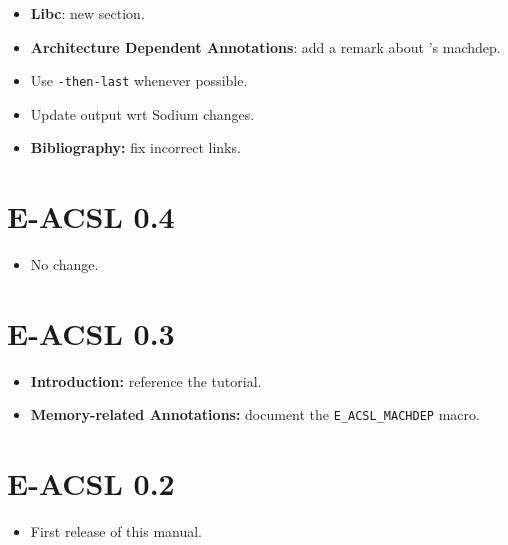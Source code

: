 \begin{itemize}
\item \textbf{Libc}: new section.
\item \textbf{Architecture Dependent Annotations}: add a remark about \gcc's
  machdep.
\item Use \texttt{-then-last} whenever possible.
\item Update output wrt \framac Sodium changes.
\item \textbf{Bibliography:} fix incorrect links.
\end{itemize}

\section*{E-ACSL 0.4}

\begin{itemize}
\item No change.
\end{itemize}

\section*{E-ACSL 0.3}
\begin{itemize}
\item \textbf{Introduction:} reference the \eacsl tutorial.
\item \textbf{Memory-related Annotations:} document the
  \lstinline|E_ACSL_MACHDEP| macro.
\end{itemize}

\section*{E-ACSL 0.2}

\begin{itemize}
\item First release of this manual.
\end{itemize}
